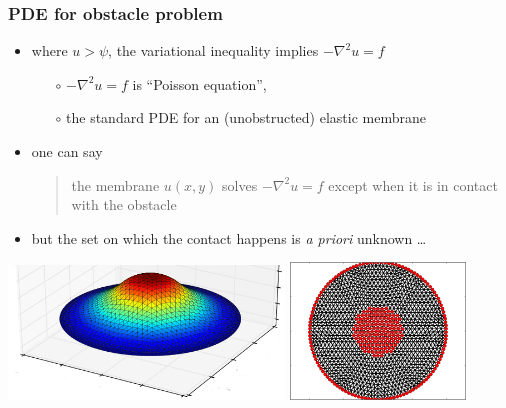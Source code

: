 \documentclass{beamer}
\newcommand{\grad}{\nabla}
\begin{document}
\begin{frame}
  \frametitle{PDE for obstacle problem}

\small
\begin{itemize}
\item where $u>\psi$, the variational inequality implies $-\grad^2 u = f$
   \begin{itemize}
   \item[$\circ$] $-\grad^2 u = f$ is ``Poisson equation'',
   \item[$\circ$] the standard PDE for an (unobstructed) elastic membrane
   \end{itemize}
\item one can say
\begin{quote}
the membrane $u(x,y)$ solves $-\grad^2 u = f$ except when it is in contact with the obstacle
\end{quote}
\item but the set on which the contact happens is \emph{a priori} unknown \dots
\end{itemize}
\normalsize

\begin{center}
\includegraphics[width=0.55\textwidth]{figs/obs-soln} \quad \includegraphics[width=0.35\textwidth]{figs/obs-coincidence} 
\end{center}
\end{frame}
\end{document}
